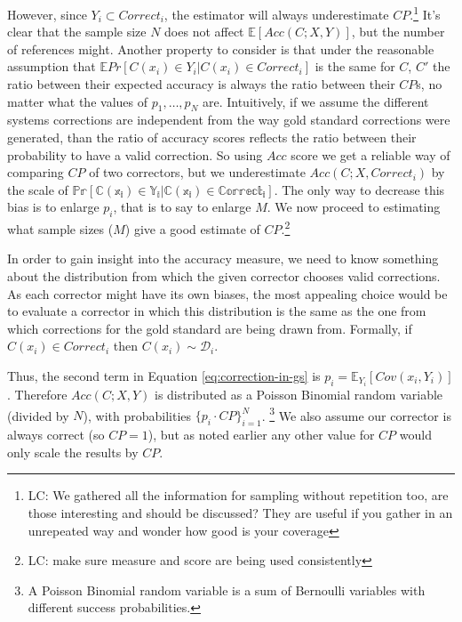 \documentclass[english]{article}
\newcommand{\lc}[1]{\footnote{\color{green}LC: #1}}
\begin{document}
 However,
since $Y_i \subset Correct_i$, the estimator will always underestimate $CP$.\lc{We gathered all the information for sampling without repetition too, are those interesting and should be discussed? They are useful if you gather in an unrepeated way and wonder how good is your coverage }
It's clear that the sample size $N$ does not affect $\mathbb{E}[Acc(C;X,Y)]$, but the number of references
might. Another property to consider is that under the reasonable assumption that $\mathbb{E}Pr[C(x_i) \in Y_i | C(x_i) \in Correct_i]$ is the same for $C$, $C'$ the ratio between their expected accuracy
is always the ratio between their $CP$s, no matter what the values of $p_1,\ldots,p_N$ are. Intuitively, if we assume the different systems corrections are independent from the way gold standard corrections were generated, than the ratio of accuracy scores reflects the ratio between their probability to have a valid correction.
So using $Acc$ score we get a reliable way of comparing $CP$ of two correctors,
but we underestimate $Acc(C;X,Correct_i)$ by the scale of $\mathbb{Pr[C(x_i) \in Y_i | C(x_i) \in Correct_i]}$. The only way to decrease this bias
is to enlarge $p_i$, that is to say to enlarge $M$. 
We now proceed to estimating what sample sizes ($M$) give a good estimate of $CP$.\lc{make sure measure and score are being used consistently}

In order to gain insight into the accuracy measure, we need to know something about the distribution from which the given corrector chooses valid corrections. As each corrector might have its own biases, the most appealing choice would be to evaluate a corrector in which this distribution is the same as the one from which corrections for the gold standard are being drawn from. Formally, if $C(x_i) \in Correct_i$ then $C(x_i) \sim \mathcal{D}_i$. 

Thus, the second
term in Equation \ref{eq:correction-in-gs} is $p_i = \mathbb{E}_{Y_i}[Cov(x_i,Y_i)]$. Therefore $Acc(C;X,Y)$ is distributed as
a Poisson Binomial random variable (divided by $N$), with probabilities $\{p_i \cdot CP\}_{i=1}^N$. \footnote{A Poisson Binomial random variable is a sum of Bernoulli variables with different success probabilities.} We also assume our corrector is always correct (so $CP=1$), but as noted earlier any other value for $CP$ would only scale the results by $CP$.
\end{document}
